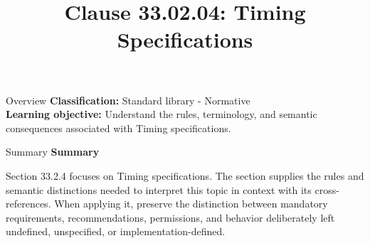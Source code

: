 \documentclass[10pt,letterpaper]{article}
\title{Clause 33.02.04: Timing Specifications}
\author{}
\date{}
\begin{document}
\maketitle
\begin{CornellOverviewBox}{Overview}
\textbf{Classification:} Standard library - Normative\\[2pt]
\textbf{Learning objective:} Understand the rules, terminology, and semantic consequences associated with Timing specifications.
\end{CornellOverviewBox}\begin{CornellSummaryBox}{Summary}
{\sffamily\bfseries\color{Accent} Summary}\par\vspace{3pt}Section 33.2.4 focuses on Timing specifications. The section supplies the rules and semantic distinctions needed to interpret this topic in context with its cross-references. When applying it, preserve the distinction between mandatory requirements, recommendations, permissions, and behavior deliberately left undefined, unspecified, or implementation-defined.
\end{CornellSummaryBox}
\end{document}
